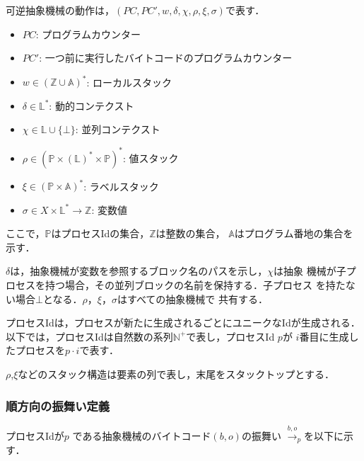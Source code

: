 \documentclass[submit,PRO]{ipsj}
\newtheorem{defn}[thm]{定義}
\begin{document}
可逆抽象機械の動作は，$(PC,PC',w,\delta,\chi,\rho,\xi,\sigma)$で表す．
\begin{itemize}
\item $PC$: プログラムカウンター
\item $PC'$: 一つ前に実行したバイトコードのプログラムカウンター
\item $w\in(\mathbb{Z}\cup\mathbb{A})^\ast$: ローカルスタック
\item $\delta\in\mathbb{L}^\ast$: 動的コンテクスト
\item $\chi\in \mathbb{L}\cup\{\bot\}$: 並列コンテクスト
\item $\rho\in(\mathbb{P}\times(\mathbb{L})^\ast\times\mathbb{P})^\ast$: 値スタック
\item $\xi\in(\mathbb{P}\times\mathbb{A})^\ast$: ラベルスタック
\item $\sigma\in X\times\mathbb{L}^\ast\rightarrow\mathbb{Z}$: 変数値
\end{itemize}
ここで，$\mathbb{P}$はプロセスIdの集合，$\mathbb{Z}$は整数の集合，
$\mathbb{A}$はプログラム番地の集合を示す．

$\delta$は，抽象機械が変数を参照するブロック名のパスを示し，$\chi$は抽象
機械が子プロセスを持つ場合，その並列ブロックの名前を保持する．子プロセス
を持たない場合$\bot$となる．$\rho$，$\xi$，$\sigma$はすべての抽象機械で
共有する．

プロセスIdは，プロセスが新たに生成されるごとにユニークなIdが生成される．
以下では，プロセスIdは自然数の系列$\mathbb{N}^+$で表し，プロセスId $p$が
$i$番目に生成したプロセスを$p\cdot i$で表す．

$\rho$,$\xi$などのスタック構造は要素の列で表し，末尾をスタックトップとする．

\subsubsection{順方向の振舞い定義}

プロセスIdが$p$ である抽象機械のバイトコード$(b,o)$の振舞い
$\xrightarrow{b,o}_{p}$を以下に示す．
\end{document}
